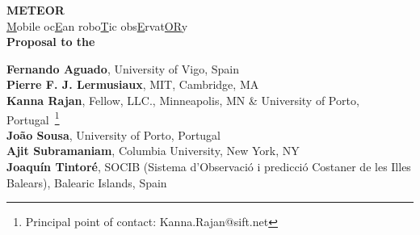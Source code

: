 \begin{titlepage}

  \begin{center}

    
    \Large{\textbf{METEOR}\\
      \underline{M}obile oc\underline{E}an robo\underline{T}ic obs\underline{E}rvat\underline{OR}y}\\
\ifkeck
\vspace{+2.5in}
\textbf{Proposal to the \kck}
\vspace{+2.9in}
\else
\vspace{+5in}
\fi

  \large
  \textbf{Fernando Aguado}, University of Vigo, Spain\\
  \textbf{Pierre F. J. Lermusiaux}, MIT, Cambridge, MA\\
  \textbf{Kanna Rajan}, Fellow, \org LLC., Minneapolis, MN \& University of Porto, Portugal~\footnote{Principal point of
    contact: Kanna.Rajan@sift.net}\\
  \textbf{Jo\~ao Sousa}, University of Porto, Portugal\\
  \textbf{Ajit Subramaniam}, Columbia University, New York, NY\\
  \textbf{Joaqu\'{i}n Tintor\'{e}}, SOCIB (Sistema d’Observaci\'{o} i predicci\'{o} Costaner de les Illes Balears), Balearic Islands, Spain\\
  \vspace{+0.2in}



\end{center}
\end{titlepage}
